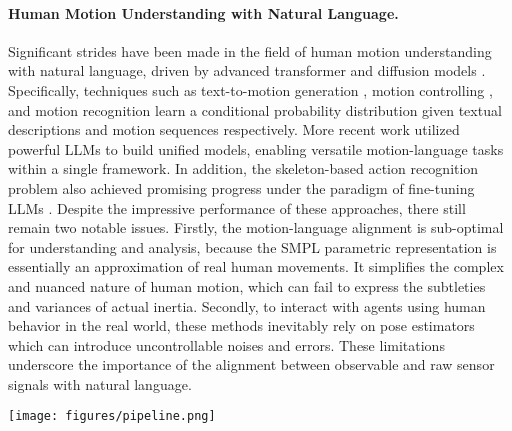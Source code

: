 \paragraph{Human Motion Understanding with Natural Language.}
Significant strides have been made in the field of human motion understanding with natural language, driven by advanced transformer \cite{vaswani2017attention} and diffusion models \cite{ho2020denoising,song2020denoising}. Specifically, techniques such as text-to-motion generation \cite{tevet2023human,tevet2022motionclip,zhang2024motiondiffuse,Guo_2022_CVPR,zhang2024motiongpt}, motion controlling \cite{delmas2023posefix,athanasiou2024motionfix,xie2024omnicontrol,huang2024controllable}, and motion recognition \cite{locate:2024} learn a conditional probability distribution given textual descriptions and motion sequences respectively. More recent work \cite{jiang2023motiongpt,li2024unimotion,wu2024motionllm,li2024lamp,zhou2024avatargpt,wang2024motiongpt} utilized powerful LLMs to build unified models, enabling versatile motion-language tasks within a single framework. In addition, the skeleton-based action recognition problem also achieved promising progress under the paradigm of fine-tuning LLMs \cite{qu2024llms,mo2024mochat,do2024tdsm}. Despite the impressive performance of these approaches, there still remain two notable issues. Firstly, the motion-language alignment is sub-optimal for understanding and analysis, because the SMPL parametric representation \cite{SMPL2015,MANO:SIGGRAPHASIA:2017,SMPLX2019} is essentially an approximation of real human movements. It simplifies the complex and nuanced nature of human motion, which can fail to express the subtleties and variances of actual inertia. Secondly, to interact with agents using human behavior in the real world, these methods inevitably rely on pose estimators which can introduce uncontrollable noises and errors. These limitations underscore the importance of the alignment between observable and raw sensor signals with natural language.

\begin{figure*}[t]
  \centering
  \texttt{[image: figures/pipeline.png]}
  \vspace{-20px}
\label{fig:train}
\vspace{-10px}
\end{figure*}

